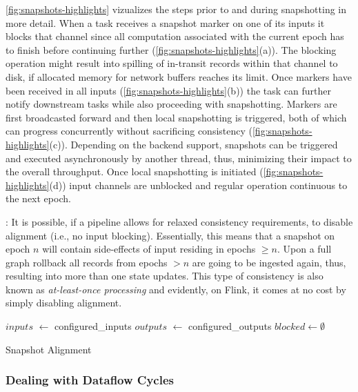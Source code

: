  \autoref{fig:snapshots-highlights} vizualizes the steps prior to and during snapshotting in more detail. When a task receives a snapshot marker on one of its inputs it blocks that channel since all computation associated with the current epoch has to finish before continuing further (\autoref{fig:snapshots-highlights}(a)). The blocking operation might result into spilling of in-transit records within that channel to disk, if allocated memory for network buffers reaches its limit. Once markers have been received in all inputs (\autoref{fig:snapshots-highlights}(b)) the task can further notify downstream tasks while also proceeding with snapshotting. Markers are first broadcasted forward and then local snapshotting is triggered, both of which can progress concurrently without sacrificing consistency (\autoref{fig:snapshots-highlights}(c)). Depending on the backend support, snapshots can be triggered and executed asynchronously by another thread, thus, minimizing their impact to the overall throughput. Once local snapshotting is initiated (\autoref{fig:snapshots-highlights}(d)) input channels are unblocked and regular operation continuous to the next epoch. 

: It is possible, if a pipeline allows for relaxed consistency requirements, to disable alignment (i.e., no input blocking). Essentially, this means that a snapshot on epoch $n$ will contain side-effects of input residing in epochs $\geq n$. Upon a full graph rollback all records from epochs $> n$ are going to be ingested again, thus, resulting into more than one state updates. This type of consistency is also known as \emph{at-least-once processing} and evidently, on Flink, it comes at no cost by simply disabling alignment.


\begin{algorithm}[h]
$inputs$ $\leftarrow$ configured\_inputs\;
$outputs$ $\leftarrow$ configured\_outputs\;
$blocked \leftarrow \emptyset$ \;

\caption{Snapshot Alignment}
\label{alg:snapdag}
\end{algorithm}

\subsubsection{Dealing with Dataflow Cycles}

